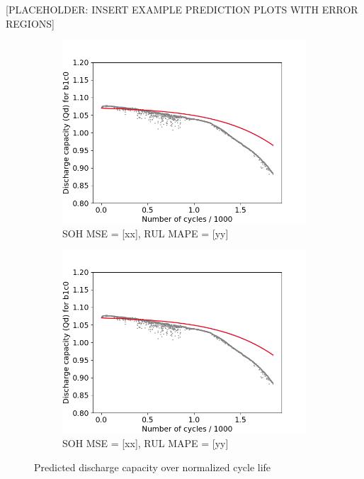 \documentclass{article}
\begin{document}
[PLACEHOLDER: INSERT EXAMPLE PREDICTION PLOTS WITH ERROR REGIONS]
    \begin{figure}[H]
        \centering
        \begin{subfigure}[b]{0.49\linewidth}
            \includegraphics[width=\linewidth]{figs/bayes_plot_with_error_b1c0.png}
            \caption{SOH MSE = [xx], RUL MAPE = [yy]}
        \end{subfigure}
        \begin{subfigure}[b]{0.49\linewidth}
            \includegraphics[width=\linewidth]{figs/bayes_plot_with_error_b1c0.png}
            \caption{SOH MSE = [xx], RUL MAPE = [yy]}
        \end{subfigure}
        \caption{Predicted discharge capacity over normalized cycle life}
        \label{fig:bayespred}
    \end{figure}
\end{document}
